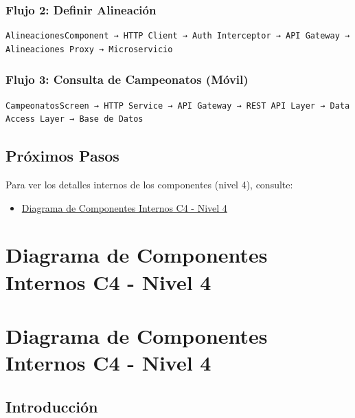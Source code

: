 \documentclass[
  spanish,
  11pt,
  letterpaper,
]{book}
\providecommand{\tightlist}{%
  \setlength{\itemsep}{0pt}\setlength{\parskip}{0pt}}
\begin{document}
\subsection{Flujo 2: Definir
Alineación}\label{flujo-2-definir-alineaciuxf3n}

\begin{verbatim}
AlineacionesComponent → HTTP Client → Auth Interceptor → API Gateway → Alineaciones Proxy → Microservicio
\end{verbatim}

\subsection{Flujo 3: Consulta de Campeonatos
(Móvil)}\label{flujo-3-consulta-de-campeonatos-muxf3vil}

\begin{verbatim}
CampeonatosScreen → HTTP Service → API Gateway → REST API Layer → Data Access Layer → Base de Datos
\end{verbatim}

\section{Próximos Pasos}\label{pruxf3ximos-pasos-3}

Para ver los detalles internos de los componentes (nivel 4), consulte:

\begin{itemize}
\tightlist
\item
  \href{c4-level4.qmd}{Diagrama de Componentes Internos C4 - Nivel 4}
\end{itemize}

\chapter{Diagrama de Componentes Internos C4 - Nivel
4}\label{diagrama-de-componentes-internos-c4---nivel-4}

\chapter{Diagrama de Componentes Internos C4 - Nivel
4}\label{diagrama-de-componentes-internos-c4---nivel-4-1}

\section{Introducción}\label{introducciuxf3n-4}
\end{document}
